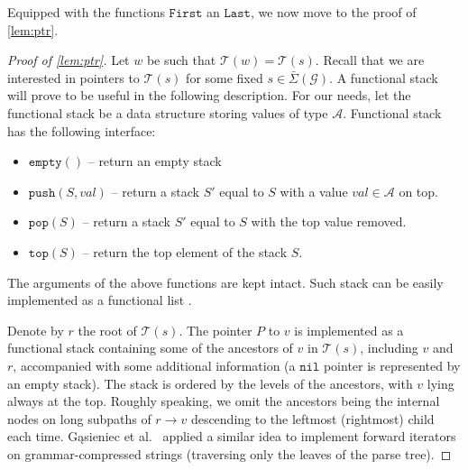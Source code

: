 \documentclass[a4paper]{article}
\theoremstyle{remark}
\newcommand{\sigs}{\bar{\Sigma}}
\newcommand{\grammar}{\mathcal{G}}
\newcommand{\stree}{\mathcal{T}}
\newcommand{\itnil}{\mathtt{nil}}
\newcommand{\itfirst}{\mathtt{First}}
\newcommand{\itlast}{\mathtt{Last}}
\newcommand{\stpush}{\mathtt{push}}
\newcommand{\stpop}{\mathtt{pop}}
\newcommand{\sttop}{\mathtt{top}}
\newcommand{\stempty}{\mathtt{empty}}
\begin{document}
Equipped with the functions $\itfirst$ an $\itlast$, we now move to the proof
of \cref{lem:ptr}.
\begin{proof}[Proof of \cref{lem:ptr}]
  Let $w$ be such that $\stree(w)=\stree(s)$.
  Recall that we are interested in pointers to $\stree(s)$ for some fixed
$s\in\sigs(\grammar)$.
A functional stack will prove to be useful in the following description.
For our needs, let the functional stack be a data structure storing
values of type $\mathcal{A}$. Functional stack has the following interface:
\begin{itemize}
  \item $\stempty()$ -- return an empty stack
  \item $\stpush(S,val)$ -- return a stack $S'$ equal to $S$ with a value $val\in\mathcal{A}$ on top.
  \item $\stpop(S)$ -- return a stack $S'$ equal to $S$ with the top value removed.
  \item $\sttop(S)$ -- return the top element of the stack $S$.
\end{itemize}
The arguments of the above functions are kept intact.
Such stack can be easily implemented as a functional list \cite{Okasaki:1999}.

Denote by $r$ the root of $\stree(s)$.
The pointer $P$ to $v$ is implemented as a functional stack containing
some of the ancestors of $v$ in $\stree(s)$, including $v$ and $r$,
accompanied with some additional information (a $\itnil$ pointer
is represented by an empty stack).
The stack is ordered by the levels of the ancestors, with $v$
lying always at the top.
Roughly speaking, we omit the ancestors being the internal nodes
on long subpaths of $r\to v$ descending to the leftmost (rightmost)
child each time. Gąsieniec et al.~\cite{DBLP:conf/dcc/GasieniecKPS05} applied a similar idea
to implement forward iterators on grammar-compressed strings (traversing only the leaves of the parse tree).


\end{proof}
\end{document}
